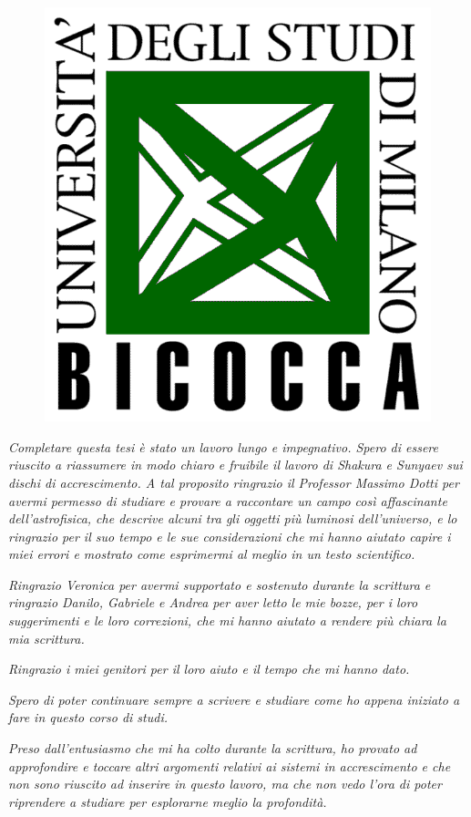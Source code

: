 \documentclass[a4paperbi]{article}
\begin{document}
\begin{titlepage}
	\begin{figure}[H]
		\centering
		\includegraphics[width=0.4\linewidth]{LogoBicocca}
		\label{fig:logobicocca}
	\end{figure} %
\vfill %
\end{titlepage}

\newpage
\vspace*{\fill}
\textit{Completare questa tesi è stato un lavoro lungo e impegnativo. Spero di essere riuscito a riassumere in modo chiaro e fruibile il lavoro di Shakura e Sunyaev sui dischi di accrescimento. A tal proposito ringrazio il Professor Massimo Dotti per avermi permesso di studiare e provare a raccontare un campo così affascinante dell'astrofisica, che descrive alcuni tra gli oggetti più luminosi dell'universo, e lo ringrazio per il suo tempo e le sue considerazioni che mi hanno aiutato capire i miei errori e mostrato come esprimermi al meglio in un testo scientifico.}

\textit{Ringrazio Veronica per avermi supportato e sostenuto durante la scrittura e ringrazio Danilo, Gabriele e Andrea per aver letto le mie bozze, per i loro suggerimenti e le loro correzioni, che mi hanno aiutato a rendere più chiara la mia scrittura.}

\textit{Ringrazio i miei genitori per il loro aiuto e il tempo che mi hanno dato.}

\textit{Spero di poter continuare sempre a scrivere e studiare come ho appena iniziato a fare in questo corso di studi.}

\textit{Preso dall'entusiasmo che mi ha colto durante la scrittura, ho provato ad approfondire e toccare altri argomenti relativi ai sistemi in accrescimento e che non sono riuscito ad inserire in questo lavoro, ma che non vedo l'ora di poter riprendere a studiare per esplorarne meglio la profondità.}
\vspace*{\fill}
\end{document}
